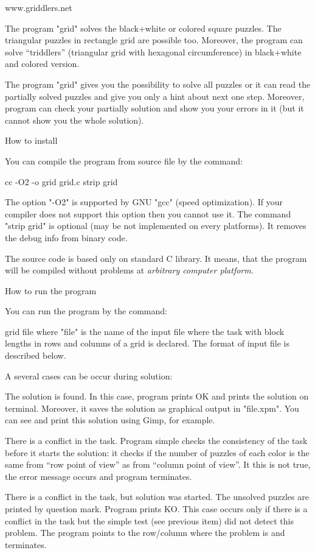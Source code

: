 \begtt
www.griddlers.net
\endtt

The program "grid" solves the black+white or colored square puzzles.
The triangular puzzles in rectangle grid are possible too. Moreover,
the program can solve ``triddlers'' (triangular grid with hexagonal 
circumference) in black+white and colored version.

The program "grid" gives you the possibility to solve all puzzles
or it can read the partially solved puzzles and give you only 
a hint about next one step. Moreover, program can check your partially
solution and show you your errors in it (but it cannot show you the
whole solution).


\tit How to install

You can compile the program from source file by the command:

\begtt
cc -O2 -o grid grid.c
strip grid
\endtt

The option "-O2" is supported by GNU "gcc" (speed optimization).
If your compiler does not support this option then you cannot use it.
The command "strip grid" is optional (may be not implemented on every
platforms). It removes the debug info from binary code.

The source code is based only on standard C library. It means, that
the program will be compiled without problems at 
{\it arbitrary computer platform}.


\tit How to run the program 

You can run the program by the command:

\begtt
grid file
\endtt
%
where "file" is the name of the input file where the task with block
lengths in rows and columns of a grid is declared. The format of input
file is described below.

A several cases can be occur during solution:

\bod The solution is found.
  In this case, program prints OK and prints the solution on terminal.
  Moreover, it saves the solution as graphical output in "file.xpm".
  You can see and print this solution using Gimp, for example.

\bod There is a conflict in the task.
  Program simple checks the consistency of the task before it starts 
  the solution: it checks if the number of puzzles of each color
  is the same from ``row point of view'' as from ``column point of view''.
  It this is not true, the error message occurs and program terminates.

\bod There is a conflict in the task, but solution was started.
  The unsolved puzzles are printed by question mark. Program prints KO.
  This case occurs only if there is a conflict in the task but
  the simple test (see previous item) did not detect this problem.
  The program points to the row/column where the problem is and terminates.

